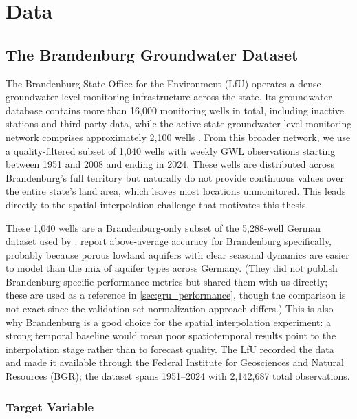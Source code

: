 \chapter{Data}
\label{ch:data}

\section{The Brandenburg Groundwater Dataset}
\label{sec:dataset}

The Brandenburg State Office for the Environment (LfU) operates a dense groundwater-level
monitoring infrastructure across the state. Its groundwater database contains more than
16{,}000 monitoring wells in total, including inactive stations and third-party data, while
the active state groundwater-level monitoring network comprises approximately 2{,}100 wells \citep{lfu2024styx}.
From this broader network, we use a quality-filtered subset of
1{,}040 wells with weekly GWL observations starting between 1951 and 2008 and ending in 2024. These
wells are distributed across Brandenburg's full territory but naturally do not provide
continuous values over the entire state's land area, which leaves most locations unmonitored.
This leads directly to the spatial interpolation challenge that motivates this thesis.

These 1{,}040 wells are a Brandenburg-only subset of the 5{,}288-well German dataset used
by \citet{kunz2025}. \citeauthor{kunz2025} report above-average accuracy for Brandenburg specifically, 
probably because porous lowland aquifers with clear seasonal dynamics are easier to model than the
mix of aquifer types across Germany. (They did not publish Brandenburg-specific performance metrics but shared them with us directly; these
are used as a reference in \cref{sec:gru_performance}, though the comparison is not exact
since the validation-set normalization approach differs.) This is also why Brandenburg is a good
choice for the spatial interpolation experiment: a strong temporal baseline would mean poor
spatiotemporal results point to the interpolation stage rather than to forecast quality. The LfU
recorded the data and made it available through the Federal Institute for Geosciences and
Natural Resources (BGR); the dataset spans 1951--2024 with 2{,}142{,}687 total observations.

\subsection{Target Variable}


